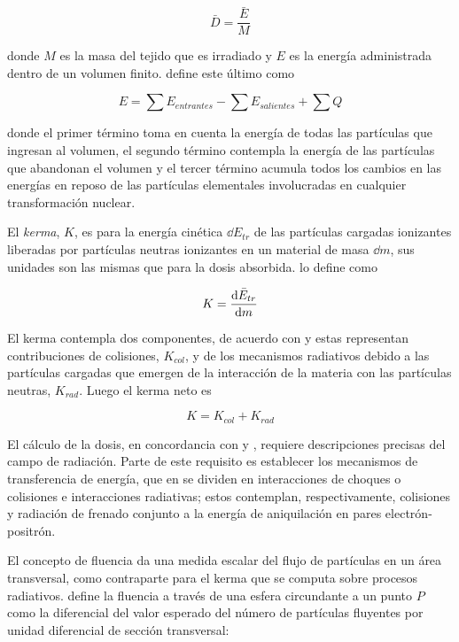\documentclass[12pt,letterpaper, oneside]{book}
\begin{document}
	\begin{equation}
		\bar{D}=\frac{\bar{E}}{M}\label{dosis_segun_carlsson}
	\end{equation}
	
	\noindent donde $M$ es la masa del tejido que es irradiado y $E$ es la energía administrada dentro de un volumen finito. \cite{Mayles.2007} define este último  como 
	
	\begin{equation}
	E = \sum E_{entrantes} - \sum E_{salientes} + \sum Q\label{energia_administrada}
	\end{equation}
	
	\noindent donde el primer término toma en cuenta la energía de todas las partículas que ingresan al volumen, el segundo término contempla la energía de las partículas que abandonan el volumen y el tercer término acumula todos los cambios en las energías en reposo de las partículas elementales involucradas en cualquier transformación nuclear. 

	El \textit{kerma}, $K$, es para \cite{Mayles.2007} la energía cinética $\dd{E_{tr}}$ de las partículas cargadas ionizantes liberadas por partículas neutras ionizantes en un material de masa $\dd{m}$, sus unidades son las mismas que para la dosis absorbida. \cite{Podgorsak.2016} lo define como
	
	$$K=\dv{\bar{E}_{tr}}{m}$$
	
	El kerma contempla dos componentes, de acuerdo con \cite{Mayles.2007} y \cite{IAEA.2005} estas representan contribuciones de colisiones, $K_{col}$, y de los mecanismos radiativos debido a las partículas cargadas que emergen de la interacción de la materia con las partículas neutras, $K_{rad}$. Luego el kerma neto es
	
	$$K=K_{col}+K_{rad}$$
	
	El cálculo de la dosis, en concordancia con \cite{Mayles.2007} y \cite{Podgorsak.2016}, requiere descripciones precisas del campo de radiación. Parte de este requisito es establecer los mecanismos de transferencia de energía, que en \cite{IAEA.2005} se dividen en interacciones de choques o colisiones e interacciones radiativas; estos contemplan, respectivamente, colisiones y radiación de frenado conjunto a la energía de aniquilación en pares electrón-positrón. 
	
	El concepto de fluencia da una medida escalar del flujo de partículas en un área transversal, como contraparte para el kerma que se computa sobre procesos radiativos\cite{IAEA.2005}. \cite{Mayles.2007} define la fluencia a través de una esfera circundante a un punto $P$ como la diferencial del valor esperado del número de partículas fluyentes por unidad diferencial de sección transversal:
	
\end{document}
